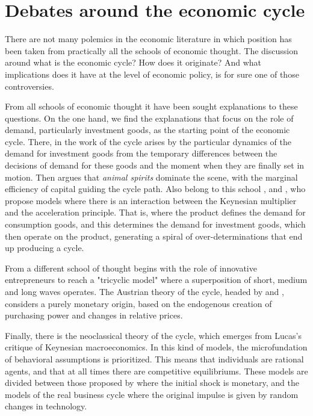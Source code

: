 \documentclass[a4paper]{article}
\begin{document}
\section{Debates around the economic cycle}

There are not many polemics in the economic literature in which position has been taken from practically all the schools of economic thought. The discussion around what is the economic cycle? How does it originate? And what implications does it have at the level of economic policy, is for sure one of those controversies.

From all schools of economic thought it have been sought explanations to these questions. On the one hand, we find the explanations that focus on the role of demand, particularly investment goods, as the starting point of the economic cycle. There, in the work of \cite{kalecki2013essays} the cycle arises by the particular dynamics of the demand for investment goods from the temporary differences between the decisions of demand for these goods and the moment when they are finally set in motion. Then \cite{keynes2018general} argues that \textit{animal spirits} dominate the scene, with the marginal efficiency of capital guiding the cycle path. Also belong to this school \cite {harrod1936trade}, \cite{kaldor1940model} and \cite{samuelson1939synthesis}, who propose models where there is an interaction between the Keynesian multiplier and the acceleration principle. That is, where the product defines the demand for consumption goods, and this determines the demand for investment goods, which then operate on the product, generating a spiral of over-determinations that end up producing a cycle.

From a different school of thought \cite{schumpeter1939business} begins with the role of innovative entrepreneurs to reach a "tricyclic model" where a superposition of short, medium and long waves operates.
The Austrian theory of the cycle, headed by \cite{hayek1933} and \cite{von1943elastic}, considers a purely monetary origin, based on the endogenous creation of purchasing power and changes in relative prices.

Finally, there is the neoclassical theory of the cycle, which emerges from Lucas's critique of Keynesian macroeconomics. In this kind of models, the microfundation of behavioral assumptions is prioritized. This means that individuals are rational agents, and that at all times there are competitive equilibriums. These models are divided between those proposed by \cite{lucas1975equilibrium} where the initial shock is monetary, and the models of the real business cycle \citep{plosser1989understanding} where the original impulse is given by random changes in technology.
\end{document}
